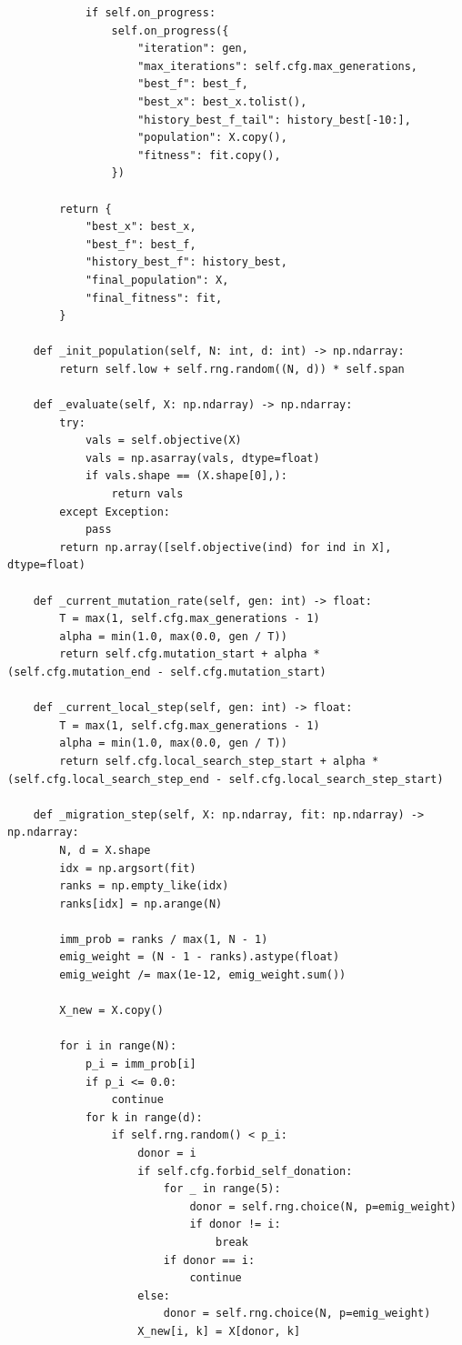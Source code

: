 \begin{lstlisting}
            if self.on_progress:
                self.on_progress({
                    "iteration": gen,
                    "max_iterations": self.cfg.max_generations,
                    "best_f": best_f,
                    "best_x": best_x.tolist(),
                    "history_best_f_tail": history_best[-10:],
                    "population": X.copy(),
                    "fitness": fit.copy(),
                })

        return {
            "best_x": best_x,
            "best_f": best_f,
            "history_best_f": history_best,
            "final_population": X,
            "final_fitness": fit,
        }

    def _init_population(self, N: int, d: int) -> np.ndarray:
        return self.low + self.rng.random((N, d)) * self.span

    def _evaluate(self, X: np.ndarray) -> np.ndarray:
        try:
            vals = self.objective(X)
            vals = np.asarray(vals, dtype=float)
            if vals.shape == (X.shape[0],):
                return vals
        except Exception:
            pass
        return np.array([self.objective(ind) for ind in X], dtype=float)

    def _current_mutation_rate(self, gen: int) -> float:
        T = max(1, self.cfg.max_generations - 1)
        alpha = min(1.0, max(0.0, gen / T))
        return self.cfg.mutation_start + alpha * (self.cfg.mutation_end - self.cfg.mutation_start)

    def _current_local_step(self, gen: int) -> float:
        T = max(1, self.cfg.max_generations - 1)
        alpha = min(1.0, max(0.0, gen / T))
        return self.cfg.local_search_step_start + alpha * (self.cfg.local_search_step_end - self.cfg.local_search_step_start)

    def _migration_step(self, X: np.ndarray, fit: np.ndarray) -> np.ndarray:
        N, d = X.shape
        idx = np.argsort(fit)
        ranks = np.empty_like(idx)
        ranks[idx] = np.arange(N)

        imm_prob = ranks / max(1, N - 1)
        emig_weight = (N - 1 - ranks).astype(float)
        emig_weight /= max(1e-12, emig_weight.sum())

        X_new = X.copy()

        for i in range(N):
            p_i = imm_prob[i]
            if p_i <= 0.0:
                continue
            for k in range(d):
                if self.rng.random() < p_i:
                    donor = i
                    if self.cfg.forbid_self_donation:
                        for _ in range(5):
                            donor = self.rng.choice(N, p=emig_weight)
                            if donor != i:
                                break
                        if donor == i:
                            continue
                    else:
                        donor = self.rng.choice(N, p=emig_weight)
                    X_new[i, k] = X[donor, k]


\end{lstlisting}
